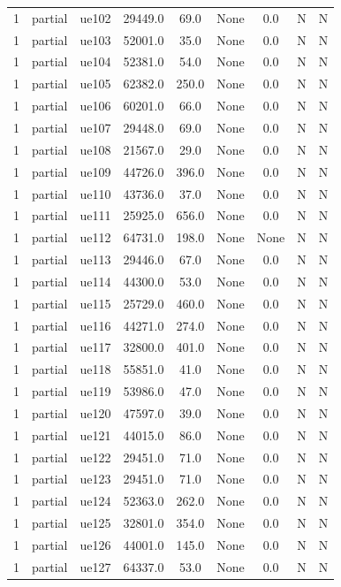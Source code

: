\begin{table}[ht]
\begin{tabular}{|c|c|c|c|c|c|c|c|c|}
1 & partial & ue102 & 29449.0 & 69.0 & None & 0.0 & N & N \\
1 & partial & ue103 & 52001.0 & 35.0 & None & 0.0 & N & N \\
1 & partial & ue104 & 52381.0 & 54.0 & None & 0.0 & N & N \\
1 & partial & ue105 & 62382.0 & 250.0 & None & 0.0 & N & N \\
1 & partial & ue106 & 60201.0 & 66.0 & None & 0.0 & N & N \\
1 & partial & ue107 & 29448.0 & 69.0 & None & 0.0 & N & N \\
1 & partial & ue108 & 21567.0 & 29.0 & None & 0.0 & N & N \\
1 & partial & ue109 & 44726.0 & 396.0 & None & 0.0 & N & N \\
1 & partial & ue110 & 43736.0 & 37.0 & None & 0.0 & N & N \\
1 & partial & ue111 & 25925.0 & 656.0 & None & 0.0 & N & N \\
1 & partial & ue112 & 64731.0 & 198.0 & None & None & N & N \\
1 & partial & ue113 & 29446.0 & 67.0 & None & 0.0 & N & N \\
1 & partial & ue114 & 44300.0 & 53.0 & None & 0.0 & N & N \\
1 & partial & ue115 & 25729.0 & 460.0 & None & 0.0 & N & N \\
1 & partial & ue116 & 44271.0 & 274.0 & None & 0.0 & N & N \\
1 & partial & ue117 & 32800.0 & 401.0 & None & 0.0 & N & N \\
1 & partial & ue118 & 55851.0 & 41.0 & None & 0.0 & N & N \\
1 & partial & ue119 & 53986.0 & 47.0 & None & 0.0 & N & N \\
1 & partial & ue120 & 47597.0 & 39.0 & None & 0.0 & N & N \\
1 & partial & ue121 & 44015.0 & 86.0 & None & 0.0 & N & N \\
1 & partial & ue122 & 29451.0 & 71.0 & None & 0.0 & N & N \\
1 & partial & ue123 & 29451.0 & 71.0 & None & 0.0 & N & N \\
1 & partial & ue124 & 52363.0 & 262.0 & None & 0.0 & N & N \\
1 & partial & ue125 & 32801.0 & 354.0 & None & 0.0 & N & N \\
1 & partial & ue126 & 44001.0 & 145.0 & None & 0.0 & N & N \\
1 & partial & ue127 & 64337.0 & 53.0 & None & 0.0 & N & N \\

\end{tabular}
\end{table}
